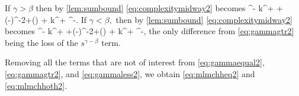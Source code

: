 If $\gamma > \beta$ then by \cref{lem:sumbound} \eqref{eq:complexitymidway2} becomes
 \ct\cth \Cppw^{\beta-\gamma}
k^{\tau + \rho+\mleft(\gamma-\beta\mright)\frac\sigma\alpha}\eps^{-2+\mleft(\frac{\beta-\gamma}{\alpha}\mright)}
 +  k^{\rho +  \frac{\gamma\sigma}\alpha}\eps^{-\frac\gamma\alpha}.\label{eq:gammagtr2}
\eeq
If $\gamma < \beta,$ then by \cref{lem:sumbound} \eqref{eq:complexitymidway2} becomes
 \ct\cth \Cppw^{\beta-\gamma}
k^{\tau + \rho+\mleft(\gamma-\beta\mright)\frac\sigma\alpha}\eps^{-2+\mleft(\frac{\beta-\gamma}{\alpha}\mright)}
 +  k^{\rho +  \frac{\gamma\sigma}\alpha}\eps^{-\frac\gamma\alpha},\label{eq:gammaless2}
\eeq
the only difference from \eqref{eq:gammagtr2} being the loss of the $s^{\gamma-\beta}$ term.

Removing all the terms that are not of interest from \eqref{eq:gammaequal2}, \eqref{eq:gammagtr2}, and \eqref{eq:gammaless2}, we obtain \eqref{eq:mlmchheq2} and \eqref{eq:mlmchhoth2}.
\epf
